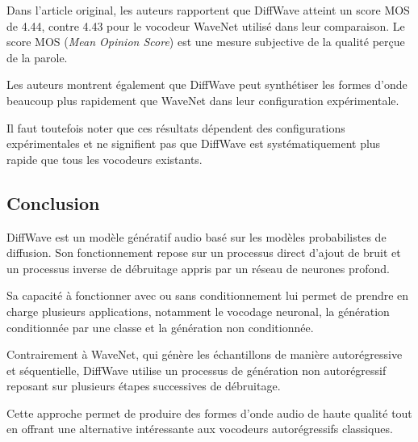 Dans l'article original, les auteurs rapportent que
DiffWave atteint un score MOS de 4.44, contre 4.43
pour le vocodeur WaveNet utilisé dans leur comparaison.
Le score MOS (\textit{Mean Opinion Score}) est une
mesure subjective de la qualité perçue de la parole.

Les auteurs montrent également que DiffWave peut
synthétiser les formes d'onde beaucoup plus rapidement
que WaveNet dans leur configuration expérimentale.

Il faut toutefois noter que ces résultats dépendent
des configurations expérimentales et ne signifient
pas que DiffWave est systématiquement plus rapide
que tous les vocodeurs existants.

\subsection{Conclusion}

DiffWave est un modèle génératif audio basé sur les
modèles probabilistes de diffusion. Son fonctionnement
repose sur un processus direct d'ajout de bruit et un
processus inverse de débruitage appris par un réseau
de neurones profond.

Sa capacité à fonctionner avec ou sans conditionnement
lui permet de prendre en charge plusieurs applications,
notamment le vocodage neuronal, la génération
conditionnée par une classe et la génération non
conditionnée.

Contrairement à WaveNet, qui génère les échantillons
de manière autorégressive et séquentielle, DiffWave
utilise un processus de génération non autorégressif
reposant sur plusieurs étapes successives de débruitage.

Cette approche permet de produire des formes d'onde
audio de haute qualité tout en offrant une alternative
intéressante aux vocodeurs autorégressifs classiques.





